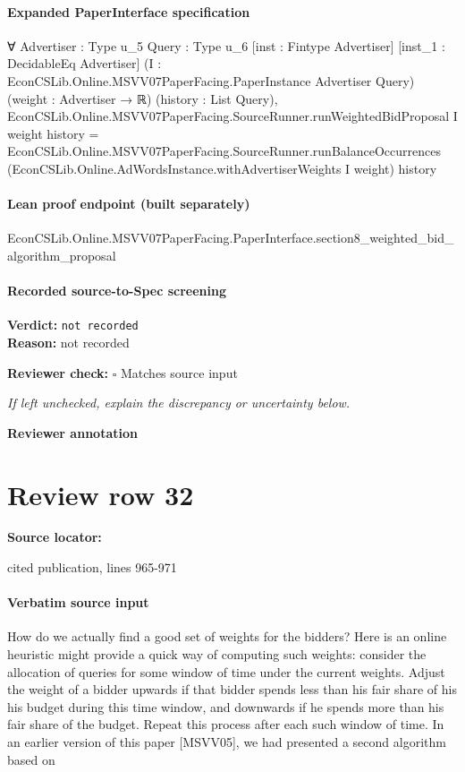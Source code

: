 \documentclass[10pt]{article}
\newcommand{\reviewerbox}{%
  \par\noindent\fbox{\parbox{0.96\linewidth}{\rule{0pt}{0.38in}}}\par
}
\newcommand{\reviewmatch}[1]{%
  \par\noindent\textbf{Reviewer check:} $\square$\; #1\par
  \noindent\emph{If left unchecked, explain the discrepancy or uncertainty below.}\par
}
\begin{document}
\paragraph{Expanded PaperInterface specification}
\begin{ReviewVerbatim}
∀ {Advertiser : Type u_5} {Query : Type u_6} [inst : Fintype Advertiser] [inst_1 : DecidableEq Advertiser]
  (I : EconCSLib.Online.MSVV07PaperFacing.PaperInstance Advertiser Query) (weight : Advertiser → ℝ)
  (history : List Query),
  EconCSLib.Online.MSVV07PaperFacing.SourceRunner.runWeightedBidProposal I weight history =
    EconCSLib.Online.MSVV07PaperFacing.SourceRunner.runBalanceOccurrences
      (EconCSLib.Online.AdWordsInstance.withAdvertiserWeights I weight) history
\end{ReviewVerbatim}

\paragraph{Lean proof endpoint (built separately)}\begin{ReviewVerbatim}
EconCSLib.Online.MSVV07PaperFacing.PaperInterface.section8_weighted_bid_algorithm_proposal
\end{ReviewVerbatim}

\paragraph{Recorded source-to-Spec screening}
\textbf{Verdict:} \texttt{not recorded}
\\
\textbf{Reason:} not recorded
\reviewmatch{Matches source input}
\noindent\textbf{Reviewer annotation}\par
\reviewerbox
\clearpage
\hypertarget{source-claim-97423e9ec14ecc23}{}
\section*{Review row 32}
\textbf{Source locator:} {\footnotesize\raggedright cited publication, lines 965-\allowbreak{}971\par}
\paragraph{Verbatim source input}
\begin{ReviewVerbatim}
How do we actually find a good set of weights for the bidders? Here is an online heuristic
might provide a quick way of computing such weights: consider the allocation of queries for
some window of time under the current weights. Adjust the weight of a bidder upwards if
that bidder spends less than his fair share of his his budget during this time window, and
downwards if he spends more than his fair share of the budget. Repeat this process after each
such window of time.
In an earlier version of this paper [MSVV05], we had presented a second algorithm based on
\end{ReviewVerbatim}
\end{document}
